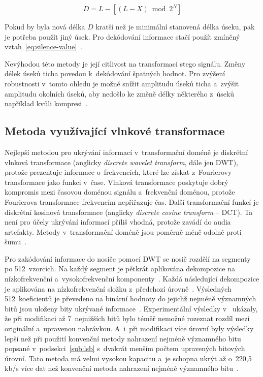 \begin{equation}
    \label{eq:silence-length}
    D = L - [(L - X) \bmod 2^N]
\end{equation}

\noindent Pokud by byla nová délka $D$ kratší než je minimální stanovená délka
úseku, pak je potřeba použít jiný úsek. Pro dekódování informace stačí použít
zmíněný vztah~\ref{eq:silence-value}~\cite{Shahreza2008}.

Nevýhodou této metody je její citlivost na transformaci stego signálu. Změny
délek úseků ticha povedou k~dekódování špatných hodnot. Pro zvýšení robustnosti
v~tomto ohledu je možné snížit amplitudu úseků ticha a~zvýšit amplitudu
okolních úseků, aby nedošlo ke změně délky některého z~úseků například kvůli
kompresi~\cite{Djebbar2012}.

\subsection*{Metoda využívající vlnkové transformace}
\label{sub:wavelet-transform}

Nejlepší metodou pro ukrývání informací v~transformační doméně je diskrétní
vlnková transformace (anglicky \textit{discrete wavelet transform}, dále jen
DWT), protože prezentuje informace o~frekvencích, které lze získat z~Fourierovy
transformace jako funkci v~čase. Vlnková transformace poskytuje dobrý kompromis
mezi časovou doménou signálu a~frekvenční doménou, protože Fourierova
transformace frekvencím nepřiřazuje čas. Další transformační funkcí je
diskrétní kosinová transformace (anglicky \textit{discrete cosine transform} --
DCT). Ta není pro účely ukrývání informací příliš vhodná, protože zavádí do
audia artefakty. Metody v~transformační doméně jsou poměrně méně odolné proti
šumu~\cite{Dutta2020}.

Pro zakódování informace do nosiče pomocí DWT se nosič rozdělí na segmenty po
512~vzorcích. Na každý segment je pětkrát aplikována dekompozice na
nízkofrekvenční a~vysokofrekvenční komponenty~\cite{Cvejic2002Wavelet}. Každá
následující dekompozice je aplikována na nízkofrekvenční složku z~předchozí
úrovně~\cite{Prabakaran2012}. Výsledných 512~koeficientů je převedeno na
binární hodnoty do jejichž nejméně významných bitů jsou uloženy bity ukrývané
informace~\cite{Cvejic2002Wavelet}. Experimentální výsledky
v~\cite{Cvejic2002Wavelet} ukázaly, že při modifikaci až 7~nejnižších bitů bylo
téměř nemožné rozeznat rozdíl mezi originální a~upravenou nahrávkou. A~i~při
modifikaci více úrovní byly výsledky lepší než při použití konvenční metody
nahrazení nejméně významného bitu popsané v~podsekci~\ref{sub:lsb} s~dvakrát
menším počtem upravených bitových úrovní. Tato metoda má velmi vysokou kapacitu
a~je schopna ukrýt až o~220,5\,kb/s více dat než konvenční metoda nahrazení
nejméně významného bitu~\cite{Cvejic2002Wavelet}.

